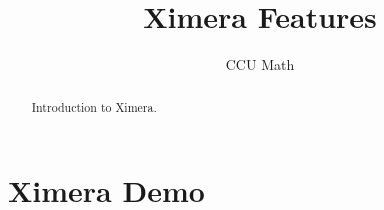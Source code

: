 \documentclass{xourse}
\title{Ximera Features}
\author{CCU Math}
\begin{document}
\begin{abstract}
    Introduction to Ximera.
\end{abstract}
\maketitle

\part{Ximera Demo}

\end{document}
